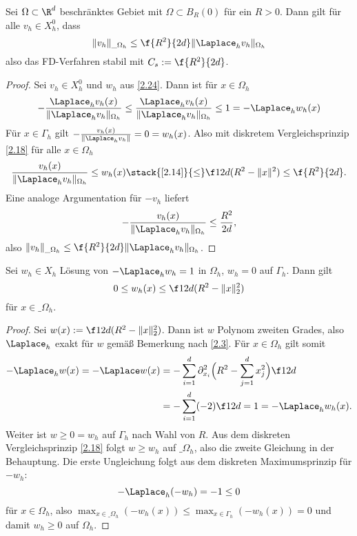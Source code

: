 \begin{st} \label{2.23}
	Sei $\Omega \subset \R^d$ beschränktes Gebiet mit $\Omega \subset B_R(0)$ für ein $R > 0$.
	Dann gilt für alle $v_h \in X_h^0$, dass
	\[
		\|v_h\|_{\_\Omega_h} \le \f {R^2}{2d} \|\Laplace_h v_h\|_{\Omega_h}
	\]
	also das FD-Verfahren stabil mit $C_s := \f {R^2}{2d}$.
	\begin{proof}
		Sei $v_h \in X_h^0$ und $w_h$ aus \ref{2.24}.
		Dann ist für $x \in \Omega_h$
		\[
			- \frac{\Laplace_h v_h(x)}{\|\Laplace_h v_h\|_{\Omega_h}}
			\le \frac{\Laplace_h v_h(x)}{\|\Laplace_h v_h\|_{\Omega_h}}
			\le 1
			= - \Laplace_h w_h(x)
		\]
		Für $x \in \Gamma_h$ gilt $- \frac{v_h(x)}{\|\Laplace_h v_h\|} = 0 = w_h(x)$.
		Also mit diskretem Vergleichsprinzip \ref{2.18} für alle $x \in \Omega_h$
		\[
			\frac{v_h(x)}{\|\Laplace_h v_h\|_{\Omega_h}}
			\le w_h(x)
			\stack{\ref{2.14}}{\le} \f 1{2d} (R^2 - \|x\|^2)
			\le \f {R^2}{2d}.
		\]
		Eine analoge Argumentation für $-v_h$ liefert
		\[
			- \frac{v_h(x)}{\|\Laplace_h v_h\|_{\Omega_h}}
			\le \frac{R^2}{2d},
		\]
		also $\|v_h\|_{\_\Omega_h} \le \f {R^2}{2d} \|\Laplace_h v_h\|_{\Omega_h}$.
	\end{proof}
\end{st}

\begin{lem} \label{2.24}
	Sei $w_h \in X_h$ Lösung von $-\Laplace_h w_h = 1$ in $\Omega_h$, $w_h = 0$ auf $\Gamma_h$.
	Dann gilt
	\begin{equation} \setcounter{equation}{6} \label{eq:2.6}
		0 \le w_h(x) \le \f 1{2d} (R^2 - \|x\|_2^2)
	\end{equation}
	für $x \in \_\Omega_h$.
	\begin{proof}
		Sei $w(x) := \f 1{2d} (R^2 - \|x\|_2^2)$.
		Dann ist $w$ Polynom zweiten Grades, also $\Laplace_h$ exakt für $w$ gemäß Bemerkung nach \ref{2.3}.
		Für $x \in \Omega_h$ gilt somit
		\begin{align*}
			-\Laplace_h w(x)
			= - \Laplace w(x)
			&= - \sum_{i=1}^d \partial_{x_i}^2 \Big(R^2 - \sum_{j=1}^d x_j^2 \Big) \f 1{2d} \\
			&= - \sum_{i=1}^d (-2) \f 1{2d}
			= 1
			= - \Laplace_h w_h(x).
		\end{align*}
		Weiter ist $w \ge 0 = w_h$ auf $\Gamma_h$ nach Wahl von $R$.
		Aus dem diskreten Vergleichsprinzip \ref{2.18} folgt $w \ge w_h$ auf $\_\Omega_h$, also die zweite Gleichung in der Behauptung.
		Die erste Ungleichung folgt aus dem diskreten Maximumsprinzip für $-w_h$:
		\[
			- \Laplace_h (-w_h) =  -1 \le 0
		\]
		für $x \in \Omega_h$, also $\max_{x\in\_\Omega_h} (-w_h(x)) \le \max_{x\in \Gamma_h} (-w_h(x)) = 0$ und damit $w_h \ge 0$ auf $\Omega_h$.
	\end{proof}
\end{lem}

